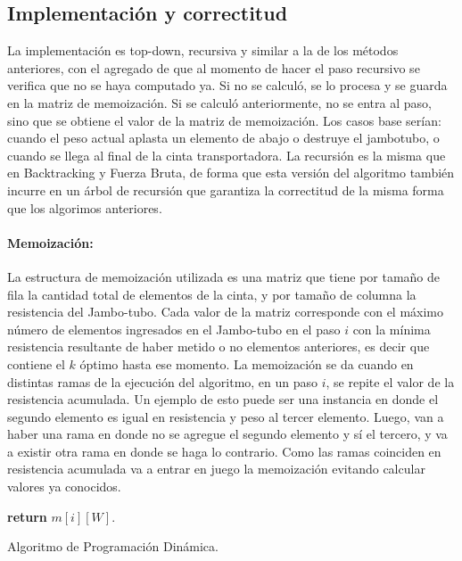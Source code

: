 \documentclass[10pt,a4paper]{article}
\begin{document}
\subsection{Implementación y correctitud}
La implementación es top-down, recursiva y similar a la de los métodos anteriores, con el agregado de que al momento de hacer el paso recursivo se verifica que no se haya computado ya. Si no se calculó, se lo procesa y se guarda en la matriz de memoización. Si se calculó anteriormente, no se entra al paso, sino que se obtiene el valor de la matriz de memoización. Los casos base serían: cuando el peso actual aplasta un elemento de abajo o destruye el jambotubo, o cuando se llega al final de la cinta transportadora. \newline 
La recursión es la misma que en Backtracking y Fuerza Bruta, de forma que esta versión del algoritmo también incurre en un árbol de recursión que garantiza la correctitud de la misma forma que los algorimos anteriores.
\paragraph{Memoización:}
La estructura de memoización utilizada es una matriz que tiene por tamaño de fila la cantidad total de elementos de la cinta, y por tamaño de columna la resistencia del Jambo-tubo. Cada valor de la matriz corresponde con el máximo número de elementos ingresados en el Jambo-tubo en el paso $i$ con la mínima resistencia resultante de haber metido o no elementos anteriores, es decir que contiene el $k$ óptimo hasta ese momento.
La memoización se da cuando en distintas ramas de la ejecución del algoritmo, en un paso $i$, se repite el valor de la resistencia acumulada. Un ejemplo de esto puede ser una instancia en donde el segundo elemento es igual en resistencia y peso al tercer elemento. Luego, van a haber una rama en donde no se agregue el segundo elemento y sí el tercero, y va a existir otra rama en donde se haga lo contrario. Como las ramas coinciden en resistencia acumulada va a entrar en juego la memoización evitando calcular valores ya conocidos.
\begin{algorithm}
	\begin{algorithmic}[1]
		
		\EndIf

		\EndIf
		
		\EndIf
		
		\State \textbf{return} $m[i][W]$.
		
		\EndFunction
	\end{algorithmic}
	\caption{Algoritmo de Programación Dinámica.}
	\label{alg:dinamica}
\end{algorithm}
\end{document}
